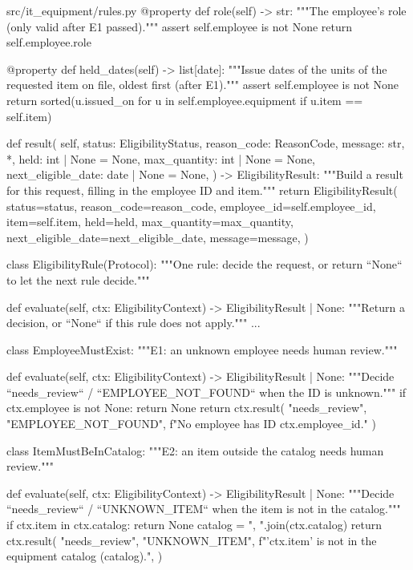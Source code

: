 \documentclass[11pt,letterpaper]{article}
\renewcommand{\_}{\textunderscore\allowbreak}
\begin{document}
\begin{codebox}{src/it_equipment/rules.py}
    @property
    def role(self) -> str:
        """The employee's role (only valid after E1 passed)."""
        assert self.employee is not None
        return self.employee.role

    @property
    def held_dates(self) -> list[date]:
        """Issue dates of the units of the requested item on file, oldest first (after E1)."""
        assert self.employee is not None
        return sorted(u.issued_on for u in self.employee.equipment if u.item == self.item)

    def result(
        self,
        status: EligibilityStatus,
        reason_code: ReasonCode,
        message: str,
        *,
        held: int | None = None,
        max_quantity: int | None = None,
        next_eligible_date: date | None = None,
    ) -> EligibilityResult:
        """Build a result for this request, filling in the employee ID and item."""
        return EligibilityResult(
            status=status,
            reason_code=reason_code,
            employee_id=self.employee_id,
            item=self.item,
            held=held,
            max_quantity=max_quantity,
            next_eligible_date=next_eligible_date,
            message=message,
        )


class EligibilityRule(Protocol):
    """One rule: decide the request, or return ``None`` to let the next rule decide."""

    def evaluate(self, ctx: EligibilityContext) -> EligibilityResult | None:
        """Return a decision, or ``None`` if this rule does not apply."""
        ...


class EmployeeMustExist:
    """E1: an unknown employee needs human review."""

    def evaluate(self, ctx: EligibilityContext) -> EligibilityResult | None:
        """Decide ``needs_review`` / ``EMPLOYEE_NOT_FOUND`` when the ID is unknown."""
        if ctx.employee is not None:
            return None
        return ctx.result(
            "needs_review", "EMPLOYEE_NOT_FOUND", f"No employee has ID {ctx.employee_id}."
        )


class ItemMustBeInCatalog:
    """E2: an item outside the catalog needs human review."""

    def evaluate(self, ctx: EligibilityContext) -> EligibilityResult | None:
        """Decide ``needs_review`` / ``UNKNOWN_ITEM`` when the item is not in the catalog."""
        if ctx.item in ctx.catalog:
            return None
        catalog = ", ".join(ctx.catalog)
        return ctx.result(
            "needs_review",
            "UNKNOWN_ITEM",
            f"'{ctx.item}' is not in the equipment catalog ({catalog}).",
        )



\end{codebox}
\end{document}

